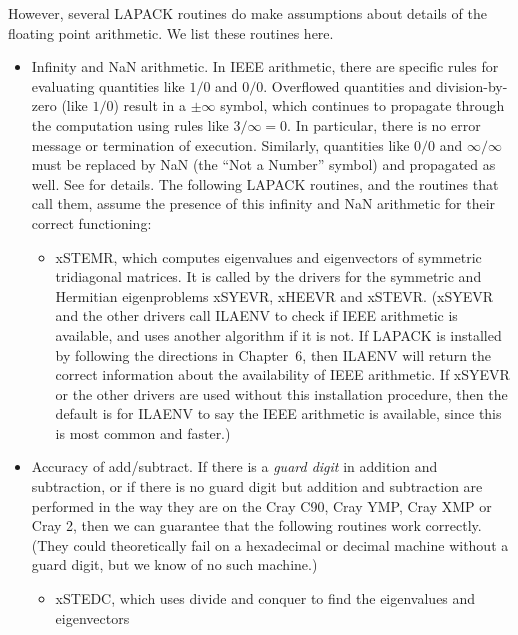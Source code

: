However, several LAPACK routines do make assumptions about details of
the floating point arithmetic. We list these routines here.
\begin{itemize}
\item Infinity and NaN arithmetic. In IEEE arithmetic, there are specific rules
for evaluating quantities like $1/0$ and $0/0$. Overflowed quantities and
division-by-zero (like $1/0$) result in a $\pm \infty$ symbol, which continues
to propagate through the computation using rules like $3/\infty = 0$.
In particular, there is no error message or termination of execution.
Similarly, quantities like $0/0$ and $\infty / \infty$ must be replaced by
NaN (the ``Not a Number'' symbol) and propagated as well. See \cite{ieee754,ieee854}
for details. The following LAPACK routines, and the routines that call them,
assume the presence of this infinity and NaN arithmetic for their correct functioning:
   \begin{itemize}
   \item xSTEMR, which computes eigenvalues and eigenvectors of symmetric tridiagonal
         matrices. It is called by the drivers for the symmetric and Hermitian
         eigenproblems xSYEVR, xHEEVR and xSTEVR. (xSYEVR and the
         other drivers call ILAENV to
         check if IEEE arithmetic is available, and uses another algorithm if it is not.
         If LAPACK is installed by following the directions in Chapter~6, then
         ILAENV will return the correct information about the availability of
         IEEE arithmetic. If xSYEVR or the other drivers are used without this
         installation procedure,
         then the default is for ILAENV to say the IEEE arithmetic is available,
         since this is most common and faster.)
   \end{itemize}
\item Accuracy of add/subtract. If there is a {\em guard digit} in addition and
   subtraction, or if there is no guard digit but addition and subtraction are
   performed in the way they are on the Cray C90, Cray YMP, Cray XMP or Cray 2,
   then we can guarantee that the following routines work correctly. (They could
   theoretically fail on a hexadecimal or decimal machine without a guard digit,
   but we know of no such machine.)
   \begin{itemize}
   \item xSTEDC, which uses divide and conquer to find the eigenvalues and eigenvectors

\end{itemize}
\end{itemize}
